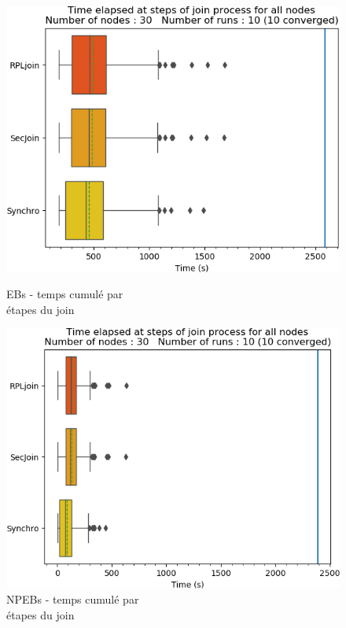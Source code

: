 \documentclass[]{report}
\begin{document}
\vspace{0.2cm}

\begin{figure}[!ht]
	\begin{minipage}{0.49\textwidth}
		\centering
		\includegraphics[width=\textwidth]{results/EB/phase_times}
		\caption{EBs - temps cumulé par\\ \noindent étapes du join}
		\label{fig:EBtimes}
	\end{minipage}\hfill
	\begin{minipage}{0.5\textwidth}
		\centering
		\includegraphics[width=\textwidth]{results/NPEB/phase_times}
		\caption{NPEBs - temps cumulé par\\ étapes du join}
		\label{fig:NPEBtimes}
	\end{minipage}	
\end{figure}
\end{document}
